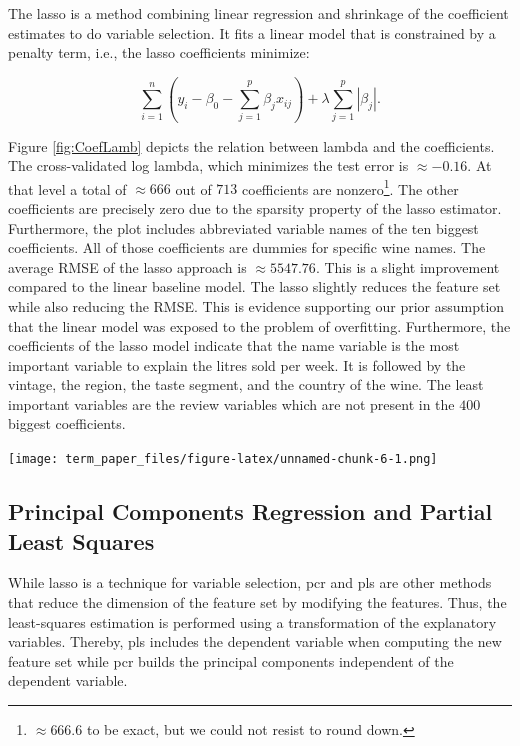 \documentclass[11pt,]{article}
\let\origfigure\figure
\let\endorigfigure\endfigure
\renewenvironment{figure}[1][2] {
    \expandafter\origfigure\expandafter[H]
} {
    \endorigfigure
}
\let\rmarkdownfootnote\footnote%
\def\footnote{\protect\rmarkdownfootnote}
\begin{document}
The \ac{lasso} is a method combining linear regression and shrinkage of
the coefficient estimates to do variable selection. It fits a linear
model that is constrained by a penalty term, i.e., the \ac{lasso}
coefficients minimize:

\[
\sum_{i=1}^{n}(y_i - \beta_0 - \sum_{j=1}^{p}\beta_jx_{ij})+\lambda\sum_{j=1}^{p}|\beta_j|.
\]

Figure \ref{fig:CoefLamb} depicts the relation between lambda and the
coefficients. The cross-validated log lambda, which minimizes the test
error is \(\approx -0.16\). At that level a total of \(\approx 666\) out
of \(713\) coefficients are
nonzero\footnote{$\approx 666.6$ to be exact, but we could not resist to round down.}.
The other coefficients are precisely zero due to the sparsity property
of the \ac{lasso} estimator. Furthermore, the plot includes abbreviated
variable names of the ten biggest coefficients. All of those
coefficients are dummies for specific wine names. The average \ac{RMSE}
of the \ac{lasso} approach is \(\approx 5547.76\). This is a slight
improvement compared to the linear baseline model. The \ac{lasso}
slightly reduces the feature set while also reducing the \ac{RMSE}. This
is evidence supporting our prior assumption that the linear model was
exposed to the problem of overfitting. Furthermore, the coefficients of
the \ac{lasso} model indicate that the name variable is the most
important variable to explain the litres sold per week. It is followed
by the vintage, the region, the taste segment, and the country of the
wine. The least important variables are the review variables which are
not present in the \(400\) biggest coefficients.

\begin{figure}
\centering
\texttt{[image: term\_paper\_files/figure-latex/unnamed-chunk-6-1.png]}
\caption{\label{fig:CoefLamb}Relation of Coefficients and Shrinkage.}
\end{figure}

\hypertarget{principal-components-regression-and-partial-least-squares}{%
\subsection{Principal Components Regression and Partial Least
Squares}\label{principal-components-regression-and-partial-least-squares}}

While \ac{lasso} is a technique for variable selection, \ac{pcr} and
\ac{pls} are other methods that reduce the dimension of the feature set
by modifying the features. Thus, the least-squares estimation is
performed using a transformation of the explanatory variables. Thereby,
\ac{pls} includes the dependent variable when computing the new feature
set while \ac{pcr} builds the principal components independent of the
dependent variable.
\end{document}
